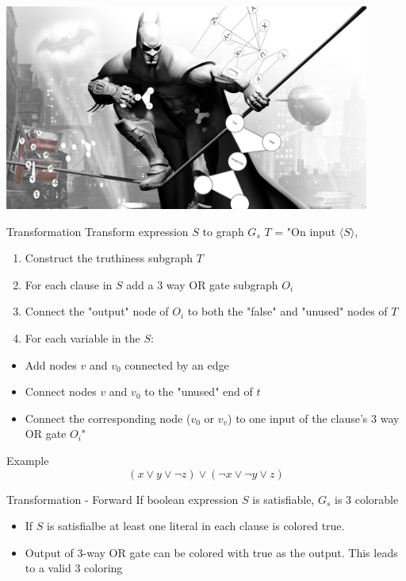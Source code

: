 \documentclass[bigger]{beamer}
\begin{document}
\begin{frame}[label=sec-14]{}
\begin{center}
\includegraphics[width=12cm]{bats.png}
\end{center}
\end{frame}

\begin{frame}[label=sec-15]{Transformation}
Transform expression \(S\) to graph \(G_s\)
\(T\) = "On input \(\langle S \rangle\),
\begin{enumerate}
\item<1-> Construct the truthiness subgraph \(T\)\\
\item<2-> For each clause in \(S\) add a 3 way OR gate subgraph \(O_i\)\\
\item<3-> Connect the "output" node of \(O_i\) to both the "false" and "unused" nodes of \(T\)
\item<4-> For each variable in the \(S\):
\end{enumerate}
\begin{itemize}
\item<5-> Add nodes \(v\) and \(v_0\) connected by an edge
\item<6-> Connect nodes \(v\) and \(v_0\) to the "unused" end of \(t\)
\item<7-> Connect the corresponding node (\(v_0\) or \(v_v\)) to one input of the clause's 3 way OR gate \(O_i\)"
\end{itemize}
\end{frame}

\begin{frame}[label=sec-16]{Example}
\[
(x \vee y \vee \neg z) \vee (\neg x \vee \neg y \vee z)
\]
\end{frame}

\begin{frame}[label=sec-17]{Transformation - Forward}
If boolean expression \(S\) is satisfiable, \(G_s\) is 3 colorable

\begin{itemize}
\item<1-> If \(S\) is satisfialbe at least one literal in each clause is colored true.
\item<2-> Output of 3-way OR gate can be colored with true as the output. This leads to a valid 3 coloring
\end{itemize}
\end{frame}
\end{document}
